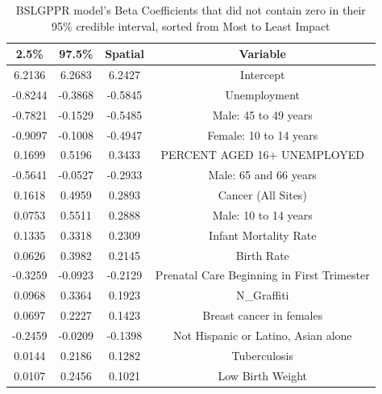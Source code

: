 \documentclass{article} %
\begin{document}
\begin{table}[h]
\centering
\begin{adjustbox}{width = 0.5\textwidth}
\begin{tabular}{cccc}
  \hline
2.5\% & 97.5\% & Spatial & Variable \\ 
  \hline
6.2136 & 6.2683 & 6.2427 & Intercept \\ 
  -0.8244 & -0.3868 & -0.5845 & Unemployment \\ 
  -0.7821 & -0.1529 & -0.5485 & Male: 45 to 49 years \\ 
  -0.9097 & -0.1008 & -0.4947 & Female: 10 to 14 years \\ 
  0.1699 & 0.5196 & 0.3433 & PERCENT AGED 16+ UNEMPLOYED \\ 
  -0.5641 & -0.0527 & -0.2933 & Male: 65 and 66 years \\ 
  0.1618 & 0.4959 & 0.2893 & Cancer (All Sites) \\ 
  0.0753 & 0.5511 & 0.2888 & Male: 10 to 14 years \\ 
  0.1335 & 0.3318 & 0.2309 & Infant Mortality Rate \\ 
  0.0626 & 0.3982 & 0.2145 & Birth Rate \\ 
  -0.3259 & -0.0923 & -0.2129 & Prenatal Care Beginning in First Trimester \\ 
  0.0968 & 0.3364 & 0.1923 & N\_Graffiti \\ 
  0.0697 & 0.2227 & 0.1423 & Breast cancer in females \\ 
  -0.2459 & -0.0209 & -0.1398 & Not Hispanic or Latino, Asian alone \\ 
  0.0144 & 0.2186 & 0.1282 & Tuberculosis \\ 
  0.0107 & 0.2456 & 0.1021 & Low Birth Weight \\ 
   \hline
\end{tabular}
\end{adjustbox}
\caption{BSLGPPR model's Beta Coefficients that did not contain zero in their 95\% credible interval, sorted from Most to Least Impact}
\label{table:spatialBetaNonZero}
\end{table}
\end{document}
